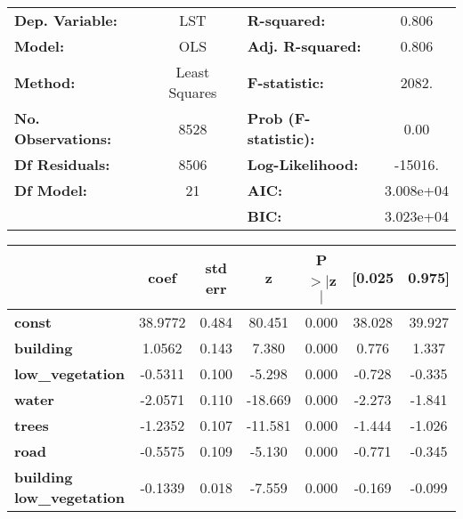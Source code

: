 \documentclass[12pt]{article}
\begin{document}
\begin{center}
\begin{tabular}{lclc}
\toprule
\textbf{Dep. Variable:}          &       LST        & \textbf{  R-squared:         } &     0.806   \\
\textbf{Model:}                  &       OLS        & \textbf{  Adj. R-squared:    } &     0.806   \\
\textbf{Method:}                 &  Least Squares   & \textbf{  F-statistic:       } &     2082.   \\
\textbf{No. Observations:}       &        8528      & \textbf{  Prob (F-statistic):} &     0.00    \\
\textbf{Df Residuals:}           &        8506      & \textbf{  Log-Likelihood:    } &   -15016.   \\
\textbf{Df Model:}               &          21      & \textbf{  AIC:               } & 3.008e+04   \\
\textbf{                     }   &                  & \textbf{  BIC:               } & 3.023e+04   \\
\bottomrule
\end{tabular}
\begin{tabular}{lcccccc}
                                 & \textbf{coef} & \textbf{std err} & \textbf{z} & \textbf{P$> |$z$|$} & \textbf{[0.025} & \textbf{0.975]}  \\
\midrule
\textbf{const}                   &      38.9772  &        0.484     &    80.451  &         0.000        &       38.028    &       39.927     \\
\textbf{building}                &       1.0562  &        0.143     &     7.380  &         0.000        &        0.776    &        1.337     \\
\textbf{low\_vegetation}         &      -0.5311  &        0.100     &    -5.298  &         0.000        &       -0.728    &       -0.335     \\
\textbf{water}                   &      -2.0571  &        0.110     &   -18.669  &         0.000        &       -2.273    &       -1.841     \\
\textbf{trees}                   &      -1.2352  &        0.107     &   -11.581  &         0.000        &       -1.444    &       -1.026     \\
\textbf{road}                    &      -0.5575  &        0.109     &    -5.130  &         0.000        &       -0.771    &       -0.345     \\
\textbf{building low\_vegetation}&      -0.1339  &        0.018     &    -7.559  &         0.000        &       -0.169    &       -0.099     \\

\end{tabular}
\end{center}
\end{document}
